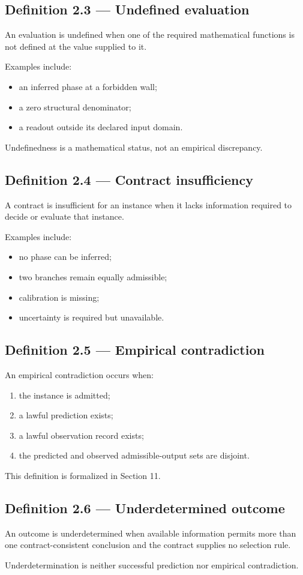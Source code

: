 \documentclass[11pt,oneside,openany]{book}
\newcommand{\PCsubsection}[1]{%
  \subsection*{#1}%
}
\begin{document}
\PCsubsection{Definition 2.3 --- Undefined evaluation}

An evaluation is undefined when one of the required mathematical functions is not defined at the value supplied to it.

Examples include:

\begin{itemize}
\item an inferred phase at a forbidden wall;
\item a zero structural denominator;
\item a readout outside its declared input domain.
\end{itemize}
Undefinedness is a mathematical status, not an empirical discrepancy.

\PCsubsection{Definition 2.4 --- Contract insufficiency}

A contract is insufficient for an instance when it lacks information required to decide or evaluate that instance.

Examples include:

\begin{itemize}
\item no phase can be inferred;
\item two branches remain equally admissible;
\item calibration is missing;
\item uncertainty is required but unavailable.
\end{itemize}
\PCsubsection{Definition 2.5 --- Empirical contradiction}

An empirical contradiction occurs when:

\begin{enumerate}
\item the instance is admitted;
\item a lawful prediction exists;
\item a lawful observation record exists;
\item the predicted and observed admissible-output sets are disjoint.
\end{enumerate}
This definition is formalized in Section 11.

\PCsubsection{Definition 2.6 --- Underdetermined outcome}

An outcome is underdetermined when available information permits more than one contract-consistent conclusion and the contract supplies no selection rule.

Underdetermination is neither successful prediction nor empirical contradiction.
\end{document}
